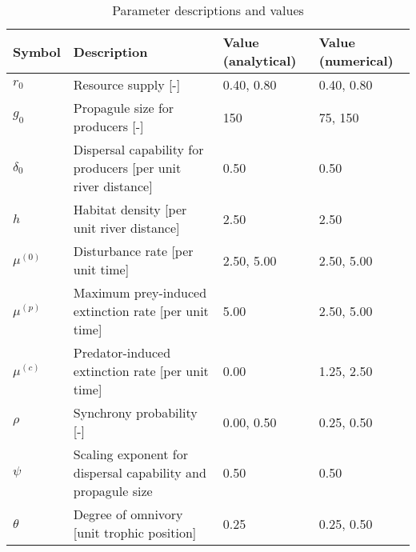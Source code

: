 \begin{table}[ht]
\centering
\caption{Parameter descriptions and values\label{tab:parms}} 
\begingroup\small
\begin{tabularx}{\textwidth}{llll}
  \hline
Symbol & Description & Value (analytical) & Value (numerical) \\ 
  \hline
$r_0$ & Resource supply [-] & 0.40, 0.80 & 0.40, 0.80 \\ 
  $g_0$ & Propagule size for producers [-] & 150 & 75, 150 \\ 
  $\delta_0$ & Dispersal capability for producers [per unit river distance] & 0.50 & 0.50 \\ 
  $h$ & Habitat density [per unit river distance] & 2.50 & 2.50 \\ 
  $\mu^{(0)}$ & Disturbance rate [per unit time] & 2.50, 5.00 & 2.50, 5.00 \\ 
  $\mu^{(p)}$ & Maximum prey-induced extinction rate [per unit time] & 5.00 & 2.50, 5.00 \\ 
  $\mu^{(c)}$ & Predator-induced extinction rate [per unit time] & 0.00 & 1.25, 2.50 \\ 
  $\rho$ & Synchrony probability [-] & 0.00, 0.50 & 0.25, 0.50 \\ 
  $\psi$ & Scaling exponent for dispersal capability and propagule size & 0.50 & 0.50 \\ 
  $\theta$ & Degree of omnivory [unit trophic position] & 0.25 & 0.25, 0.50 \\ 
   \hline
\end{tabularx}
\endgroup
\end{table}

